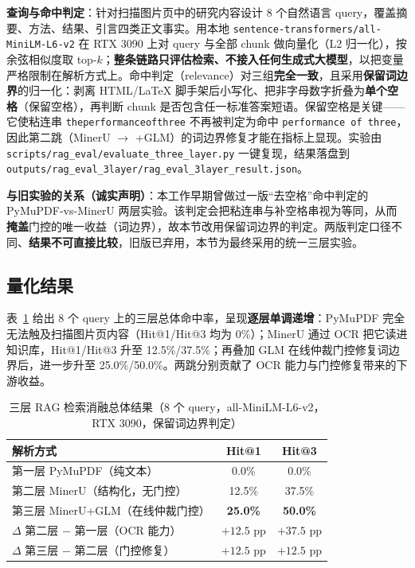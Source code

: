 \documentclass[UTF8,a4paper,11pt]{ctexart}
\begin{document}
\textbf{查询与命中判定}：针对扫描图片页中的研究内容设计 8 个自然语言 query，覆盖摘要、方法、结果、引言四类正文事实。用本地 \texttt{sentence-transformers/all-MiniLM-L6-v2} 在 RTX 3090 上对 query 与全部 chunk 做向量化（L2 归一化），按余弦相似度取 top-$k$；\textbf{整条链路只评估检索、不接入任何生成式大模型}，以把变量严格限制在解析方式上。命中判定（relevance）对三组\textbf{完全一致}，且采用\textbf{保留词边界}的归一化：剥离 HTML/LaTeX 脚手架后小写化、把非字母数字折叠为\textbf{单个空格}（保留空格），再判断 chunk 是否包含任一标准答案短语。保留空格是关键——它使粘连串 \texttt{theperformanceofthree} 不再被判定为命中 \texttt{performance of three}，因此第二跳（MinerU $\to$ +GLM）的词边界修复才能在指标上显现。实验由 \texttt{scripts/rag\_eval/evaluate\_three\_layer.py} 一键复现，结果落盘到 \texttt{outputs/rag\_eval\_3layer/rag\_eval\_3layer\_result.json}。

\textbf{与旧实验的关系（诚实声明）}：本工作早期曾做过一版``去空格''命中判定的 PyMuPDF-vs-MinerU 两层实验。该判定会把粘连串与补空格串视为等同，从而\textbf{掩盖}门控的唯一收益（词边界），故本节改用保留词边界的判定。两版判定口径不同、\textbf{结果不可直接比较}，旧版已弃用，本节为最终采用的统一三层实验。



\subsection{量化结果}

表~\ref{tab:rag-overall} 给出 8 个 query 上的三层总体命中率，呈现\textbf{逐层单调递增}：PyMuPDF 完全无法触及扫描图片页内容（Hit@1/Hit@3 均为 0\%）；MinerU 通过 OCR 把它读进知识库，Hit@1/Hit@3 升至 12.5\%/37.5\%；再叠加 GLM 在线仲裁门控修复词边界后，进一步升至 25.0\%/50.0\%。两跳分别贡献了 OCR 能力与门控修复带来的下游收益。

\begin{table}[H]
\centering
\caption{三层 RAG 检索消融总体结果（8 个 query，all-MiniLM-L6-v2，RTX 3090，保留词边界判定）}
\label{tab:rag-overall}
\begin{tabular}{lcc}
\toprule
解析方式 & Hit@1 & Hit@3 \\
\midrule
第一层 PyMuPDF（纯文本） & 0.0\% & 0.0\% \\
第二层 MinerU（结构化，无门控） & 12.5\% & 37.5\% \\
第三层 MinerU+GLM（在线仲裁门控） & \textbf{25.0\%} & \textbf{50.0\%} \\
\midrule
$\Delta$ 第二层 $-$ 第一层（OCR 能力） & $+12.5$ pp & $+37.5$ pp \\
$\Delta$ 第三层 $-$ 第二层（门控修复） & $+12.5$ pp & $+12.5$ pp \\
\bottomrule
\end{tabular}
\end{table}
\end{document}
